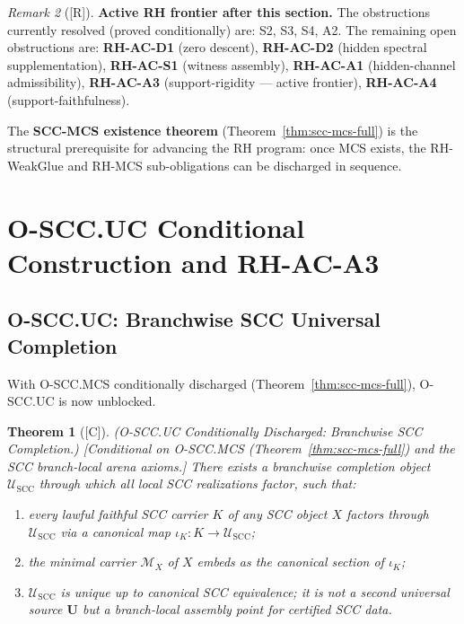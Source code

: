 \documentclass[12pt,oneside]{amsbook}
\theoremstyle{plain}
\newtheorem{theorem}{Theorem}[section]
\theoremstyle{definition}
\theoremstyle{remark}
\newtheorem{remark}[theorem]{Remark}
\newcommand{\status}[1]{\textup{[#1]}}
\begin{document}
\begin{remark}[\status{R}]\label{rem:rh-frontier}
\textbf{Active RH frontier after this section.}
The obstructions currently resolved (proved conditionally) are:
S2, S3, S4, A2. The remaining open obstructions are:
\textbf{RH-AC-D1} (zero descent), \textbf{RH-AC-D2} (hidden
spectral supplementation), \textbf{RH-AC-S1} (witness assembly),
\textbf{RH-AC-A1} (hidden-channel admissibility),
\textbf{RH-AC-A3} (support-rigidity --- active frontier),
\textbf{RH-AC-A4} (support-faithfulness).

The \textbf{SCC-MCS existence theorem}
(Theorem~\ref{thm:scc-mcs-full}) is the structural prerequisite
for advancing the RH program: once MCS exists, the RH-WeakGlue
and RH-MCS sub-obligations can be discharged in sequence.


\section{O-SCC.UC Conditional Construction and RH-AC-A3}
\label{sec:uc-and-a3}

\subsection{O-SCC.UC: Branchwise SCC Universal Completion}

With O-SCC.MCS conditionally discharged
(Theorem~\ref{thm:scc-mcs-full}), O-SCC.UC is now unblocked.

\begin{theorem}[\status{C}]\label{thm:scc-uc}
\textup{(O-SCC.UC Conditionally Discharged: Branchwise SCC
Completion.)}
\textup{[Conditional on O-SCC.MCS (Theorem~\ref{thm:scc-mcs-full})
and the SCC branch-local arena axioms.]}
There exists a branchwise completion object
$\mathcal{U}_{\mathrm{SCC}}$ through which all local SCC
realizations factor, such that:
\begin{enumerate}[label=\textup{(\arabic*)}]
 \item every lawful faithful SCC carrier $K$ of any SCC object
 $X$ factors through $\mathcal{U}_{\mathrm{SCC}}$ via a
 canonical map $\iota_K : K \to \mathcal{U}_{\mathrm{SCC}}$;
 \item the minimal carrier $\mathcal{M}_X$ of $X$ embeds as the
 canonical section of $\iota_K$;
 \item $\mathcal{U}_{\mathrm{SCC}}$ is unique up to canonical SCC
 equivalence; it is not a second universal source $\mathbf{U}$
 but a branch-local assembly point for certified SCC data.
\end{enumerate}
\end{theorem}


\end{remark}
\end{document}
